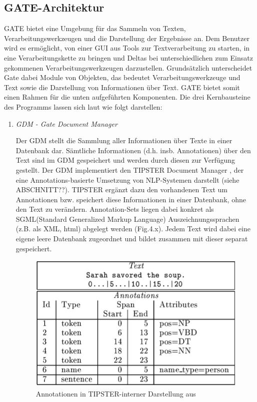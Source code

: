 \documentclass[12pt]{report}
\begin{document}
\subsection{GATE-Architektur}
GATE bietet eine Umgebung für das Sammeln von Texten, Verarbeitungswerkzeugen und die Darstellung der Ergebnisse an. Dem Benutzer wird es ermöglicht, von einer GUI aus Tools zur Textverarbeitung zu starten, in eine Verarbeitungskette zu bringen und Deltas bei unterschiedlichen zum Einsatz gekommenen Verarbeitungswerkzeugen darzustellen. Grundsätzlich unterscheidet Gate dabei Module von Objekten, das bedeutet Verarbeitungswerkzeuge und Text sowie die Darstellung von Informationen über Text. GATE bietet somit einen Rahmen für die unten aufgeführten Komponenten. Die drei Kernbausteine des Programms lassen sich laut \cite{cu02} wie folgt darstellen:
\begin{enumerate}
\item \textit{GDM - Gate Document Manager}

Der GDM stellt die Sammlung aller Informationen über Texte in einer Datenbank dar. Sämtliche Informationen (d.h. insb. Annotationen) über den Text sind im GDM gespeichert und werden durch diesen zur Verfügung gestellt. Der GDM implementiert den TIPSTER Document Manager \cite{cu97}, der eine Annotations-basierte Umsetzung von NLP-Systemen darstellt (siehe ABSCHNITT??). TIPSTER ergänzt dazu den vorhandenen Text um Annotationen bzw. speichert diese Informationen in einer Datenbank, ohne den Text zu verändern. Annotation-Sets liegen dabei konkret als SGML(Standard Generalized Markup Language) Auszeichnungssprachen (z.B. als XML, html) abgelegt werden (Fig.4.x). Jedem Text wird dabei eine eigene leere Datenbank zugeordnet und bildet zusammen mit dieser separat gespeichert.

\begin{figure}[h!]
\begin{center}
\includegraphics[scale=0.5]{GATE_Bilder/Tipster.jpg}
\caption{Annotationen in TIPSTER-interner Darstellung aus \cite{cu97}}
\end{center}
\end{figure} 


\end{enumerate}
\end{document}
